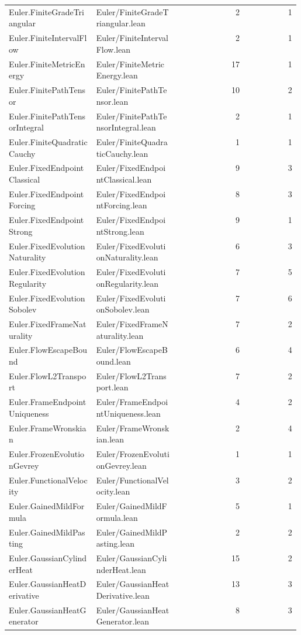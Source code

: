 \begin{longtable}{p{0.30\linewidth}p{0.28\linewidth}rr}
Euler.FiniteGradeTriangular & Euler/FiniteGradeTriangular.lean & 2 & 1\\
Euler.FiniteIntervalFlow & Euler/FiniteIntervalFlow.lean & 2 & 1\\
Euler.FiniteMetricEnergy & Euler/FiniteMetricEnergy.lean & 17 & 1\\
Euler.FinitePathTensor & Euler/FinitePathTensor.lean & 10 & 2\\
Euler.FinitePathTensorIntegral & Euler/FinitePathTensorIntegral.lean & 2 & 1\\
Euler.FiniteQuadraticCauchy & Euler/FiniteQuadraticCauchy.lean & 1 & 1\\
Euler.FixedEndpointClassical & Euler/FixedEndpointClassical.lean & 9 & 3\\
Euler.FixedEndpointForcing & Euler/FixedEndpointForcing.lean & 8 & 3\\
Euler.FixedEndpointStrong & Euler/FixedEndpointStrong.lean & 9 & 1\\
Euler.FixedEvolutionNaturality & Euler/FixedEvolutionNaturality.lean & 6 & 3\\
Euler.FixedEvolutionRegularity & Euler/FixedEvolutionRegularity.lean & 7 & 5\\
Euler.FixedEvolutionSobolev & Euler/FixedEvolutionSobolev.lean & 7 & 6\\
Euler.FixedFrameNaturality & Euler/FixedFrameNaturality.lean & 7 & 2\\
Euler.FlowEscapeBound & Euler/FlowEscapeBound.lean & 6 & 4\\
Euler.FlowL2Transport & Euler/FlowL2Transport.lean & 7 & 2\\
Euler.FrameEndpointUniqueness & Euler/FrameEndpointUniqueness.lean & 4 & 2\\
Euler.FrameWronskian & Euler/FrameWronskian.lean & 2 & 4\\
Euler.FrozenEvolutionGevrey & Euler/FrozenEvolutionGevrey.lean & 1 & 1\\
Euler.FunctionalVelocity & Euler/FunctionalVelocity.lean & 3 & 2\\
Euler.GainedMildFormula & Euler/GainedMildFormula.lean & 5 & 1\\
Euler.GainedMildPasting & Euler/GainedMildPasting.lean & 2 & 2\\
Euler.GaussianCylinderHeat & Euler/GaussianCylinderHeat.lean & 15 & 2\\
Euler.GaussianHeatDerivative & Euler/GaussianHeatDerivative.lean & 13 & 3\\
Euler.GaussianHeatGenerator & Euler/GaussianHeatGenerator.lean & 8 & 3\\

\end{longtable}
